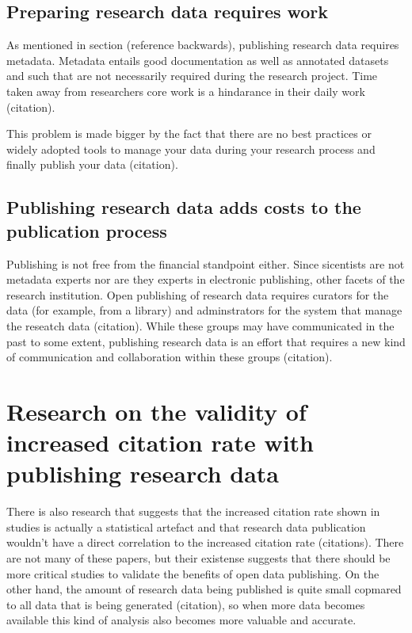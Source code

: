 \subsection{Preparing research data requires work}

As mentioned in section (reference backwards), publishing research data
requires metadata. Metadata entails good documentation as well as annotated
datasets and such that are not necessarily required during the research
project. Time taken away from researchers core work is a hindarance in their
daily work (citation).

This problem is made bigger by the fact that there are no best practices or
widely adopted tools to manage your data during your research process and
finally publish your data (citation).

\subsection{Publishing research data adds costs to the publication process}

Publishing is not free from the financial standpoint either. Since sicentists
are not metadata experts nor are they experts in electronic publishing, other
facets of the research institution. Open publishing of research data requires
curators for the data (for example, from a library) and adminstrators for the
system that manage the reseatch data (citation). While these groups may have
communicated in the past to some extent, publishing research data is an effort
that requires a new kind of communication and collaboration within these groups
(citation).

\fi

\section[Validity of the benefit research]{Research on the validity of increased citation rate with publishing
research data}

There is also research that suggests that the increased citation rate shown in
studies is actually a statistical artefact and that research data publication
wouldn't have a direct correlation to the increased citation rate (citations).
There are not many of these papers, but their existense suggests that there
should be more critical studies to validate the benefits of open data
publishing. On the other hand, the amount of research data being published
is quite small copmared to all data that is being generated (citation), so
when more data becomes available this kind of analysis also becomes more
valuable and accurate.

